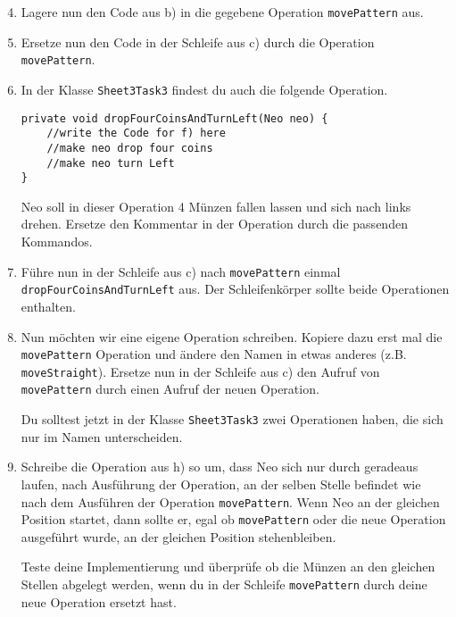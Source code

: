 \begin{enumerate}\setcounter{enumi}{3}
	\item
		Lagere nun den Code aus b) in die gegebene Operation \lstinline{movePattern} aus.

	\item
		Ersetze nun den Code in der Schleife aus c) durch die Operation \lstinline{movePattern}.

	\item
		In der Klasse \lstinline{Sheet3Task3} findest du auch die folgende Operation.

		\begin{lstlisting}
private void dropFourCoinsAndTurnLeft(Neo neo) {
    //write the Code for f) here
    //make neo drop four coins
    //make neo turn Left
}
		\end{lstlisting}

		Neo soll in dieser Operation 4 Münzen fallen lassen und sich nach links drehen.
		Ersetze den Kommentar in der Operation durch die passenden Kommandos.

	\item
		Führe nun in der Schleife aus c) nach \lstinline{movePattern} einmal \lstinline{dropFourCoinsAndTurnLeft} aus.
		Der Schleifenkörper sollte beide Operationen enthalten.

	\item
		Nun möchten wir eine eigene Operation schreiben.
		Kopiere dazu erst mal die \lstinline{movePattern} Operation und ändere den Namen in etwas anderes (z.B. \lstinline{moveStraight}).
		Ersetze nun in der Schleife aus c) den Aufruf von \lstinline{movePattern} durch einen Aufruf der neuen Operation.

		Du solltest jetzt in der Klasse \lstinline{Sheet3Task3} zwei Operationen haben, die sich nur im Namen unterscheiden.

	\item
		Schreibe die Operation aus h) so um, dass Neo sich nur durch geradeaus laufen, nach Ausführung der Operation, an der selben Stelle befindet wie nach dem Ausführen der Operation \lstinline{movePattern}.
		Wenn Neo an der gleichen Position startet, dann sollte er, egal ob \lstinline{movePattern} oder die neue Operation ausgeführt wurde, an der gleichen Position stehenbleiben.

		Teste deine Implementierung und überprüfe ob die Münzen an den gleichen Stellen abgelegt werden, wenn du in der Schleife \lstinline{movePattern} durch deine neue Operation ersetzt hast.
\end{enumerate}
\newpage
